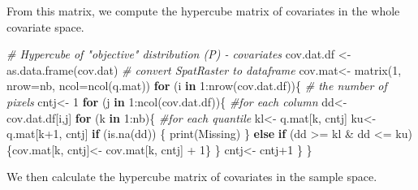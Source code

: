 \documentclass[
]{book}
\newenvironment{Shaded}{\begin{snugshade}}{\end{snugshade}}
\newcommand{\AttributeTok}[1]{\textcolor[rgb]{0.77,0.63,0.00}{#1}}
\newcommand{\CommentTok}[1]{\textcolor[rgb]{0.56,0.35,0.01}{\textit{#1}}}
\newcommand{\ControlFlowTok}[1]{\textcolor[rgb]{0.13,0.29,0.53}{\textbf{#1}}}
\newcommand{\DecValTok}[1]{\textcolor[rgb]{0.00,0.00,0.81}{#1}}
\newcommand{\FunctionTok}[1]{\textcolor[rgb]{0.00,0.00,0.00}{#1}}
\newcommand{\NormalTok}[1]{#1}
\newcommand{\OtherTok}[1]{\textcolor[rgb]{0.56,0.35,0.01}{#1}}
\newcommand{\SpecialCharTok}[1]{\textcolor[rgb]{0.00,0.00,0.00}{#1}}
\newcommand{\StringTok}[1]{\textcolor[rgb]{0.31,0.60,0.02}{#1}}
\begin{document}
From this matrix, we compute the hypercube matrix of covariates in the whole covariate space.

\begin{Shaded}
\begin{Highlighting}[]
\CommentTok{\# Hypercube of "objective" distribution (P) {-} covariates}
\NormalTok{  cov.dat.df }\OtherTok{\textless{}{-}} \FunctionTok{as.data.frame}\NormalTok{(cov.dat) }\CommentTok{\# convert SpatRaster to dataframe}
\NormalTok{  cov.mat}\OtherTok{\textless{}{-}} \FunctionTok{matrix}\NormalTok{(}\DecValTok{1}\NormalTok{, }\AttributeTok{nrow=}\NormalTok{nb, }\AttributeTok{ncol=}\FunctionTok{ncol}\NormalTok{(q.mat))}
    \ControlFlowTok{for}\NormalTok{ (i }\ControlFlowTok{in} \DecValTok{1}\SpecialCharTok{:}\FunctionTok{nrow}\NormalTok{(cov.dat.df))\{ }\CommentTok{\# the number of pixels}
\NormalTok{      cntj}\OtherTok{\textless{}{-}} \DecValTok{1} 
    \ControlFlowTok{for}\NormalTok{ (j }\ControlFlowTok{in} \DecValTok{1}\SpecialCharTok{:}\FunctionTok{ncol}\NormalTok{(cov.dat.df))\{ }\CommentTok{\#for each column}
\NormalTok{      dd}\OtherTok{\textless{}{-}}\NormalTok{ cov.dat.df[i,j]  }
      \ControlFlowTok{for}\NormalTok{ (k }\ControlFlowTok{in} \DecValTok{1}\SpecialCharTok{:}\NormalTok{nb)\{  }\CommentTok{\#for each quantile}
\NormalTok{        kl}\OtherTok{\textless{}{-}}\NormalTok{ q.mat[k, cntj] }
\NormalTok{        ku}\OtherTok{\textless{}{-}}\NormalTok{ q.mat[k}\SpecialCharTok{+}\DecValTok{1}\NormalTok{, cntj] }
        \ControlFlowTok{if}\NormalTok{ (}\FunctionTok{is.na}\NormalTok{(dd)) \{}
          \FunctionTok{print}\NormalTok{(}\StringTok{\textquotesingle{}Missing\textquotesingle{}}\NormalTok{)}
\NormalTok{        \}}
        \ControlFlowTok{else} \ControlFlowTok{if}\NormalTok{ (dd }\SpecialCharTok{\textgreater{}=}\NormalTok{ kl }\SpecialCharTok{\&}\NormalTok{ dd }\SpecialCharTok{\textless{}=}\NormalTok{ ku)\{cov.mat[k, cntj]}\OtherTok{\textless{}{-}}\NormalTok{ cov.mat[k, cntj] }\SpecialCharTok{+} \DecValTok{1}\NormalTok{\} }
\NormalTok{      \}}
\NormalTok{      cntj}\OtherTok{\textless{}{-}}\NormalTok{ cntj}\SpecialCharTok{+}\DecValTok{1}
\NormalTok{    \}}
\NormalTok{  \}}
\end{Highlighting}
\end{Shaded}

We then calculate the hypercube matrix of covariates in the sample space.
\end{document}
